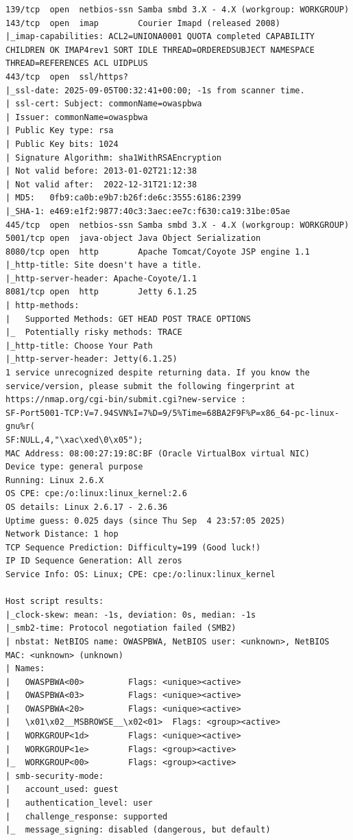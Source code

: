 \documentclass[12pt]{article}
\begin{document}
\begin{lstlisting}
139/tcp  open  netbios-ssn Samba smbd 3.X - 4.X (workgroup: WORKGROUP)
143/tcp  open  imap        Courier Imapd (released 2008)
|_imap-capabilities: ACL2=UNIONA0001 QUOTA completed CAPABILITY CHILDREN OK IMAP4rev1 SORT IDLE THREAD=ORDEREDSUBJECT NAMESPACE THREAD=REFERENCES ACL UIDPLUS
443/tcp  open  ssl/https?
|_ssl-date: 2025-09-05T00:32:41+00:00; -1s from scanner time.
| ssl-cert: Subject: commonName=owaspbwa
| Issuer: commonName=owaspbwa
| Public Key type: rsa
| Public Key bits: 1024
| Signature Algorithm: sha1WithRSAEncryption
| Not valid before: 2013-01-02T21:12:38
| Not valid after:  2022-12-31T21:12:38
| MD5:   0fb9:ca0b:e9b7:b26f:de6c:3555:6186:2399
|_SHA-1: e469:e1f2:9877:40c3:3aec:ee7c:f630:ca19:31be:05ae
445/tcp  open  netbios-ssn Samba smbd 3.X - 4.X (workgroup: WORKGROUP)
5001/tcp open  java-object Java Object Serialization
8080/tcp open  http        Apache Tomcat/Coyote JSP engine 1.1
|_http-title: Site doesn't have a title.
|_http-server-header: Apache-Coyote/1.1
8081/tcp open  http        Jetty 6.1.25
| http-methods: 
|   Supported Methods: GET HEAD POST TRACE OPTIONS
|_  Potentially risky methods: TRACE
|_http-title: Choose Your Path
|_http-server-header: Jetty(6.1.25)
1 service unrecognized despite returning data. If you know the service/version, please submit the following fingerprint at https://nmap.org/cgi-bin/submit.cgi?new-service :
SF-Port5001-TCP:V=7.94SVN%I=7%D=9/5%Time=68BA2F9F%P=x86_64-pc-linux-gnu%r(
SF:NULL,4,"\xac\xed\0\x05");
MAC Address: 08:00:27:19:8C:BF (Oracle VirtualBox virtual NIC)
Device type: general purpose
Running: Linux 2.6.X
OS CPE: cpe:/o:linux:linux_kernel:2.6
OS details: Linux 2.6.17 - 2.6.36
Uptime guess: 0.025 days (since Thu Sep  4 23:57:05 2025)
Network Distance: 1 hop
TCP Sequence Prediction: Difficulty=199 (Good luck!)
IP ID Sequence Generation: All zeros
Service Info: OS: Linux; CPE: cpe:/o:linux:linux_kernel

Host script results:
|_clock-skew: mean: -1s, deviation: 0s, median: -1s
|_smb2-time: Protocol negotiation failed (SMB2)
| nbstat: NetBIOS name: OWASPBWA, NetBIOS user: <unknown>, NetBIOS MAC: <unknown> (unknown)
| Names:
|   OWASPBWA<00>         Flags: <unique><active>
|   OWASPBWA<03>         Flags: <unique><active>
|   OWASPBWA<20>         Flags: <unique><active>
|   \x01\x02__MSBROWSE__\x02<01>  Flags: <group><active>
|   WORKGROUP<1d>        Flags: <unique><active>
|   WORKGROUP<1e>        Flags: <group><active>
|_  WORKGROUP<00>        Flags: <group><active>
| smb-security-mode: 
|   account_used: guest
|   authentication_level: user
|   challenge_response: supported
|_  message_signing: disabled (dangerous, but default)


\end{lstlisting}
\end{document}
